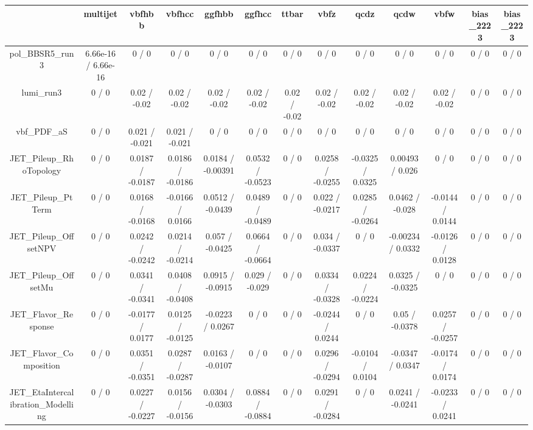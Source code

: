 \documentclass[10pt]{article}
\begin{document}
\begin{table}[htbp]
\begin{center}
\begin{tabular}{|c|c|c|c|c|c|c|c|c|c|c|c|c|}
\hline 
      & multijet      & vbfhbb      & vbfhcc      & ggfhbb      & ggfhcc      & ttbar      & vbfz      & qcdz      & qcdw      & vbfw      & bias_2223      & bias_2223 \\ 
\hline 
  pol_BBSR5_run3 & 6.66e-16 / 6.66e-16 & 0 / 0 & 0 / 0 & 0 / 0 & 0 / 0 & 0 / 0 & 0 / 0 & 0 / 0 & 0 / 0 & 0 / 0 & 0 / 0 & 0 / 0 \\ 
  lumi_run3 & 0 / 0 & 0.02 / -0.02 & 0.02 / -0.02 & 0.02 / -0.02 & 0.02 / -0.02 & 0.02 / -0.02 & 0.02 / -0.02 & 0.02 / -0.02 & 0.02 / -0.02 & 0.02 / -0.02 & 0 / 0 & 0 / 0 \\ 
  vbf_PDF_aS & 0 / 0 & 0.021 / -0.021 & 0.021 / -0.021 & 0 / 0 & 0 / 0 & 0 / 0 & 0 / 0 & 0 / 0 & 0 / 0 & 0 / 0 & 0 / 0 & 0 / 0 \\ 
  JET_Pileup_RhoTopology & 0 / 0 & 0.0187 / -0.0187 & 0.0186 / -0.0186 & 0.0184 / -0.00391 & 0.0532 / -0.0523 & 0 / 0 & 0.0258 / -0.0255 & -0.0325 / 0.0325 & 0.00493 / 0.026 & 0 / 0 & 0 / 0 & 0 / 0 \\ 
  JET_Pileup_PtTerm & 0 / 0 & 0.0168 / -0.0168 & -0.0166 / 0.0166 & 0.0512 / -0.0439 & 0.0489 / -0.0489 & 0 / 0 & 0.022 / -0.0217 & 0.0285 / -0.0264 & 0.0462 / -0.028 & -0.0144 / 0.0144 & 0 / 0 & 0 / 0 \\ 
  JET_Pileup_OffsetNPV & 0 / 0 & 0.0242 / -0.0242 & 0.0214 / -0.0214 & 0.057 / -0.0425 & 0.0664 / -0.0664 & 0 / 0 & 0.034 / -0.0337 & 0 / 0 & -0.00234 / 0.0332 & -0.0126 / 0.0128 & 0 / 0 & 0 / 0 \\ 
  JET_Pileup_OffsetMu & 0 / 0 & 0.0341 / -0.0341 & 0.0408 / -0.0408 & 0.0915 / -0.0915 & 0.029 / -0.029 & 0 / 0 & 0.0334 / -0.0328 & 0.0224 / -0.0224 & 0.0325 / -0.0325 & 0 / 0 & 0 / 0 & 0 / 0 \\ 
  JET_Flavor_Response & 0 / 0 & -0.0177 / 0.0177 & 0.0125 / -0.0125 & -0.0223 / 0.0267 & 0 / 0 & 0 / 0 & -0.0244 / 0.0244 & 0 / 0 & 0.05 / -0.0378 & 0.0257 / -0.0257 & 0 / 0 & 0 / 0 \\ 
  JET_Flavor_Composition & 0 / 0 & 0.0351 / -0.0351 & 0.0287 / -0.0287 & 0.0163 / -0.0107 & 0 / 0 & 0 / 0 & 0.0296 / -0.0294 & -0.0104 / 0.0104 & -0.0347 / 0.0347 & -0.0174 / 0.0174 & 0 / 0 & 0 / 0 \\ 
  JET_EtaIntercalibration_Modelling & 0 / 0 & 0.0227 / -0.0227 & 0.0156 / -0.0156 & 0.0304 / -0.0303 & 0.0884 / -0.0884 & 0 / 0 & 0.0291 / -0.0284 & 0 / 0 & 0.0241 / -0.0241 & -0.0233 / 0.0241 & 0 / 0 & 0 / 0 \\ 

\end{tabular}
\end{center}
\end{table}
\end{document}
